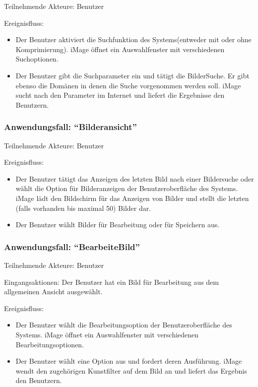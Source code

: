\documentclass[parskip=full]{scrartcl}
\begin{document}
Teilnehmende Akteure: Benutzer

Ereignisfluss:

\begin{itemize}[nosep]
\item Der Benutzer aktiviert die Suchfunktion des Systems(entweder mit oder ohne Komprimierung). iMage öffnet ein Auswahlfenster mit verschiedenen Suchoptionen.
\item Der Benutzer gibt die Suchparameter ein und tätigt die BilderSuche. Er gibt ebenso die Domänen in denen die Suche vorgenommen werden soll. iMage sucht nach den Parameter im Internet und liefert die Ergebnisse den Benutzern.
\end{itemize}

\subsubsection{Anwendungsfall: "`Bilderansicht"'}

Teilnehmende Akteure: Benutzer

Ereignisfluss:

\begin{itemize}[nosep]
\item Der Benutzer tätigt das Anzeigen des letzten Bild nach einer Bildersuche oder wählt die Option für Bilderanzeigen der Benutzeroberfläche des Systems. iMage lädt den Bildschirm für das Anzeigen von Bilder und stellt die letzten (falls vorhanden bis maximal 50) Bilder dar.
\item Der Benutzer wählt Bilder für Bearbeitung oder für Speichern aus.
\end{itemize}

\subsubsection{Anwendungsfall: "`BearbeiteBild"'}

Teilnehmende Akteure: Benutzer

Eingangsaktionen: Der Benutzer hat ein Bild für Bearbeitung aus dem allgemeinen Ansicht ausgewählt.

Ereignisfluss:

\begin{itemize}[nosep]
\item Der Benutzer wählt die Bearbeitungsoption der Benutzeroberfläche des Systems. iMage öffnet ein Auswahlfenster mit verschiedenen Bearbeitungsoptionen.
\item Der Benutzer wählt eine Option aus und fordert deren Ausführung. iMage wendt den zugehörigen Kunstfilter auf dem Bild an und liefert das Ergebnis den Benutzern.
\end{itemize}
\end{document}
